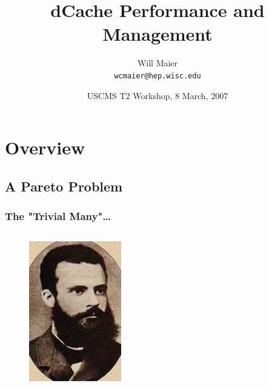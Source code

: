 \documentclass{beamer}
\title{dCache Performance and Management}
\author[Will Maier]{Will Maier \\ \texttt{wcmaier@hep.wisc.edu}}
\institute[Wisconsin]{University of Wisconsin - High Energy Physics}
\date[8 March, 2007]{USCMS T2 Workshop, 8 March, 2007}
\begin{document}
\begin{frame}
    \titlepage
\end{frame}

\section{Overview}
\begin{frame}
\tableofcontents
\end{frame}

\subsection{A Pareto Problem}

\begin{frame}
\frametitle{The "Trivial Many"\dots{}}
\begin{columns}[t]
\begin{column}{.25\textwidth}
    \begin{figure}
        \includegraphics*[width=.8\textwidth]{Graphics/Pareto.jpg}

\end{figure}
\end{column}
\end{columns}
\end{frame}
\end{document}
